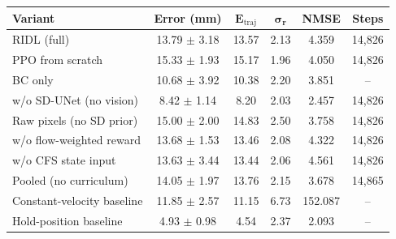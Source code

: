 \begin{tabular}{lccccc}
\toprule
\textbf{Variant} & \textbf{Error (mm)} & $\bm{E_{\mathrm{traj}}}$ & $\bm{\sigma_r}$ & \textbf{NMSE} & \textbf{Steps} \\
\midrule
RIDL (full) & 13.79 $\pm$ 3.18 & 13.57 & 2.13 & 4.359 & 14,826 \\
PPO from scratch & 15.33 $\pm$ 1.93 & 15.17 & 1.96 & 4.050 & 14,826 \\
BC only & 10.68 $\pm$ 3.92 & 10.38 & 2.20 & 3.851 & -- \\
w/o SD-UNet (no vision) & 8.42 $\pm$ 1.14 & 8.20 & 2.03 & 2.457 & 14,826 \\
Raw pixels (no SD prior) & 15.00 $\pm$ 2.00 & 14.83 & 2.50 & 3.758 & 14,826 \\
w/o flow-weighted reward & 13.68 $\pm$ 1.53 & 13.46 & 2.08 & 4.322 & 14,826 \\
w/o CFS state input & 13.63 $\pm$ 3.44 & 13.44 & 2.06 & 4.561 & 14,826 \\
Pooled (no curriculum) & 14.05 $\pm$ 1.97 & 13.76 & 2.15 & 3.678 & 14,865 \\
Constant-velocity baseline & 11.85 $\pm$ 2.57 & 11.15 & 6.73 & 152.087 & -- \\
Hold-position baseline & 4.93 $\pm$ 0.98 & 4.54 & 2.37 & 2.093 & -- \\
\bottomrule
\end{tabular}
